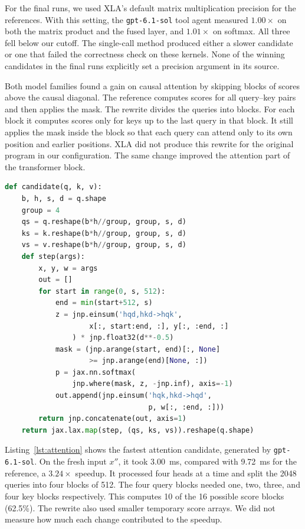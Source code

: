 \documentclass[conference]{IEEEtran}
\begin{document}
For the final runs, we used XLA's default matrix multiplication
precision for the references. With this setting, the
\texttt{gpt-6.1-sol} tool agent measured $1.00\times$ on both the
matrix product and the fused layer, and $1.01\times$ on softmax. All
three fell below our cutoff. The single-call method produced either a
slower candidate or one that failed the correctness check on these
kernels. None of the winning candidates in the final runs explicitly
set a precision argument in its source.

Both model families found a gain on causal attention by skipping blocks
of scores above the causal diagonal. The reference computes scores for
all query--key pairs and then applies the mask. The rewrite divides the
queries into blocks. For each block it computes scores only for keys up
to the last query in that block. It still applies the mask inside the
block so that each query can attend only to its own position and
earlier positions. XLA did not produce this rewrite for the original
program in our configuration. The same change improved the attention
part of the transformer block.

\begin{lstlisting}[float=t, language=Python, basicstyle=\scriptsize\ttfamily,
  label=lst:attention, caption={The fastest attention rewrite
  ($3.24\times$, \texttt{gpt-6.1-sol}). \texttt{q},
  \texttt{k} and \texttt{v} have shape (batch, heads, sequence, head width). \newline}]
def candidate(q, k, v):
    b, h, s, d = q.shape
    group = 4
    qs = q.reshape(b*h//group, group, s, d)
    ks = k.reshape(b*h//group, group, s, d)
    vs = v.reshape(b*h//group, group, s, d)
    def step(args):
        x, y, w = args
        out = []
        for start in range(0, s, 512):
            end = min(start+512, s)
            z = jnp.einsum('hqd,hkd->hqk',
                    x[:, start:end, :], y[:, :end, :]
                ) * jnp.float32(d**-0.5)
            mask = (jnp.arange(start, end)[:, None]
                    >= jnp.arange(end)[None, :])
            p = jax.nn.softmax(
                jnp.where(mask, z, -jnp.inf), axis=-1)
            out.append(jnp.einsum('hqk,hkd->hqd',
                                  p, w[:, :end, :]))
        return jnp.concatenate(out, axis=1)
    return jax.lax.map(step, (qs, ks, vs)).reshape(q.shape)
\end{lstlisting}

Listing~\ref{lst:attention} shows the fastest attention candidate, generated by
\texttt{gpt-6.1-sol}. On the fresh input $x''$, it took 3.00~ms,
compared with 9.72~ms for the reference, a $3.24\times$ speedup. It
processed four heads at a time and split the 2048 queries into four
blocks of 512. The four query blocks needed one, two, three, and four
key blocks respectively. This computes 10 of the 16 possible score
blocks (62.5\%). The rewrite also used smaller temporary score arrays.
We did not measure how much each change contributed to the speedup.
\end{document}
